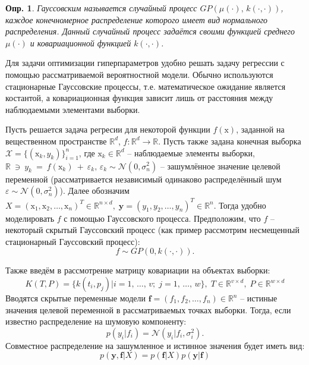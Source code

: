 \documentclass[12pt,fleqn]{article}
\newtheorem{definition}{Опр.}
\begin{document}
\begin{definition}
Гауссовским называется случайный процесс $GP(\mu(\cdot),\, k(\cdot, \cdot))$, каждое конечномерное распределение которого имеет вид нормального распределения. Данный случайный процесс задаётся своими функцией среднего $\mu(\cdot)$ и ковариационной функцией $k(\cdot, \cdot)$.
\end{definition}

Для задачи оптимизации гиперпараметров удобно решать задачу регрессии с помощью рассматриваемой вероятностной модели.
Обычно используются стационарные Гауссовские процессы, т.е. математическое ожидание является костантой, а ковариационная функция зависит лишь от расстояния между наблюдаемыми элементами выборки. 

Пусть решается задача регресии для некоторой функции $f(\boldsymbol{\mathrm{x}})$, заданной на вещественном пространстве $\mathbb{R}^d$, $f\!: \mathbb{R}^d \rightarrow \mathbb{R}$. Пусть также задана конечная выборка $\mathcal{X} = \{(\boldsymbol{\mathrm{x}}_k, y_k)\}_{i=1}^{n}$, где $\boldsymbol{\mathrm{x}}_k \in \mathbb{R}^d$ -- наблюдаемые элементы выборки, $\mathbb{R}~\ni~y_k~=~f(\boldsymbol{\mathrm{x}}_k)~+~\varepsilon_k,\, \varepsilon_k \sim\mathcal{N}(0, \sigma_n^2)$ --  зашумлённое значение целевой переменной (рассматривается независимый одинаково распределённый шум $\varepsilon \sim \mathcal{N}(0, \sigma^2_n)$). Далее обозначим $X = (\boldsymbol{\mathrm{x}}_1, \boldsymbol{\mathrm{x}}_2, \dots, \boldsymbol{\mathrm{x}}_n)^T \in \mathbb{R}^{n\times d},\; \boldsymbol{y} = (y_1, y_2, \dots, y_n)^T \in \mathbb{R}^{n}$. Тогда удобно моделировать $f$ с помощью Гауссовского процесса. Предположим, что $f$ -- некоторый скрытый Гауссовский процесс (как пример рассмотрим несмещенный стационарный Гауссовский процесс):
$$f \sim GP(0, k(\cdot, \cdot)).$$

Также введём в рассмотрение матрицу ковариации на объектах выборки:
$$K(T, P) = \{k(t_i, p_j) | i = 1,\, \dots,\, v;\; j = 1,\, \dots,\, w\},\; T \in \mathbb{R}^{v\times d},\; P \in \mathbb{R}^{w\times d}$$
Вводятся скрытые переменные модели $\boldsymbol{f} = (f_1, f_2, \dots, f_n) \in \mathbb{R}^n$ -- истиные значения целевой переменной в рассматриваемых точках выборки. Тогда, если известно распределение на шумовую компоненту:
$$p(y_i | f_i) = \mathcal{N}(y_i|f_i, \sigma_i^2).$$
Совместное распределение на зашумленное и истинное значения будет иметь вид:
$$p(\boldsymbol{y}, \boldsymbol{f} | X) = p(\boldsymbol{f}|X)p(\boldsymbol{y} | \boldsymbol{f})$$
\end{document}
